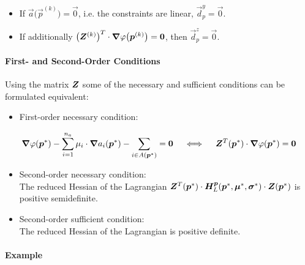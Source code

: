 					\begin{itemize}
						\item If \( \vec{a}\big(\vec{p}^{(k)}\big) = \vec{0} \), i.e. the constraints are linear, \( \vec{d}_p^y = \vec{0} \).
						\item If additionally \( \big(\bm{Z}^{(k)}\big)^T \cdot \grad{\varphi}\big(\bm{p}^{(k)}\big) = \bm{0} \), then \( \vec{d}_p^z = \vec{0} \).
					\end{itemize}

				\paragraph{First- and Second-Order Conditions}
					Using the matrix \( \bm{Z} \) some of the necessary and sufficient conditions can be formulated equivalent:
					\begin{itemize}
						\item First-order necessary condition:
					\end{itemize}
					\begin{align*}
						\grad{\varphi}(\bm{p}^\ast) - \sum_{i = 1}^{n_a} \mu_i \cdot \grad{a_i}(\bm{p}^\ast) - \sum_{i \in A(\bm{p}^\ast)} = \bm{0}
						\quad\iff\quad
						\bm{Z}^T(\bm{p}^\ast) \cdot \grad{\varphi}(\bm{p}^\ast) = \bm{0}
					\end{align*}
					\begin{itemize}
						\item Second-order necessary condition: \\ The reduced Hessian of the Lagrangian \( \bm{Z}^T(\bm{p}^\ast) \cdot \bm{H}_L^{\bm{p}}(\bm{p}^\ast, \bm{\mu}^\ast, \bm{\sigma}^\ast) \cdot \bm{Z}(\bm{p}^\ast) \) is positive semidefinite.
						\item Second-order sufficient condition: \\ The reduced Hessian of the Lagrangian is positive definite.
					\end{itemize}

				\paragraph{Example} %

